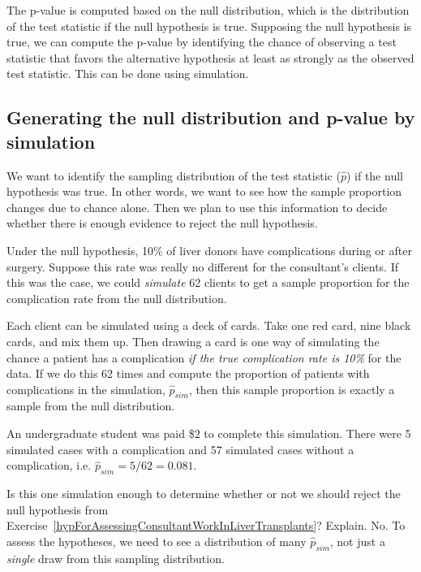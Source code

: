 The p-value is computed based on the null distribution, which is the distribution of the test statistic if the null hypothesis is true. Supposing the null hypothesis is true, we can compute the p-value by identifying the chance of observing a test statistic that favors the alternative hypothesis at least as strongly as the observed test statistic. This can be done using simulation.


\subsection{Generating the null distribution and p-value by simulation}
\label{generatingTheNullDistributionAndPValueBySimulationForOneProportion}

We want to identify the sampling distribution of the test statistic ($\hat{p}$) if the null hypothesis was true. In other words, we want to see how the sample proportion changes due to chance alone. Then we plan to use this information to decide whether there is enough evidence to reject the null hypothesis.

Under the null hypothesis, 10\% of liver donors have complications during or after surgery. Suppose this rate was really no different for the consultant's clients. If this was the case, we could \emph{simulate} 62 clients to get a sample proportion for the complication rate from the null distribution.

Each client can be simulated using a deck of cards. Take one red card, nine black cards, and mix them up. Then drawing a card is one way of simulating the chance a patient has a complication \emph{if the true complication rate is 10\%} for the data. If we do this 62 times and compute the proportion of patients with complications in the simulation, $\hat{p}_{sim}$, then this sample proportion is exactly a sample from the null distribution.

An undergraduate student was paid \$2 to complete this simulation. There were 5 simulated cases with a complication and 57 simulated cases without a complication, i.e. $\hat{p}_{sim} = 5/62 = 0.081$.

\begin{example}{Is this one simulation enough to determine whether or not we should reject the null hypothesis from Exercise~\ref{hypForAssessingConsultantWorkInLiverTransplants}? Explain.}
No. To assess the hypotheses, we need to see a distribution of many $\hat{p}_{sim}$, not just a \emph{single} draw from this sampling distribution.
\end{example}

